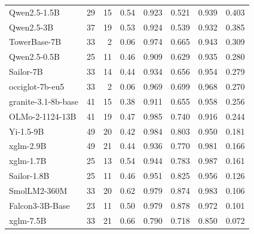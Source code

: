 \begin{center}
\begin{tabular}{lrrrrrrr}
Qwen2.5-1.5B & 29 & 15 & 0.54 & 0.923 & 0.521 & 0.939 & 0.403 \\
Qwen2.5-3B & 37 & 19 & 0.53 & 0.924 & 0.539 & 0.932 & 0.385 \\
TowerBase-7B & 33 & 2 & 0.06 & 0.974 & 0.665 & 0.943 & 0.309 \\
Qwen2.5-0.5B & 25 & 11 & 0.46 & 0.909 & 0.629 & 0.935 & 0.280 \\
Sailor-7B & 33 & 14 & 0.44 & 0.934 & 0.656 & 0.954 & 0.279 \\
occiglot-7b-eu5 & 33 & 2 & 0.06 & 0.969 & 0.699 & 0.968 & 0.270 \\
granite-3.1-8b-base & 41 & 15 & 0.38 & 0.911 & 0.655 & 0.958 & 0.256 \\
OLMo-2-1124-13B & 41 & 19 & 0.47 & 0.985 & 0.740 & 0.916 & 0.244 \\
Yi-1.5-9B & 49 & 20 & 0.42 & 0.984 & 0.803 & 0.950 & 0.181 \\
xglm-2.9B & 49 & 21 & 0.44 & 0.936 & 0.770 & 0.981 & 0.166 \\
xglm-1.7B & 25 & 13 & 0.54 & 0.944 & 0.783 & 0.987 & 0.161 \\
Sailor-1.8B & 25 & 11 & 0.46 & 0.951 & 0.825 & 0.956 & 0.126 \\
SmolLM2-360M & 33 & 20 & 0.62 & 0.979 & 0.874 & 0.983 & 0.106 \\
Falcon3-3B-Base & 23 & 11 & 0.50 & 0.979 & 0.878 & 0.972 & 0.101 \\
xglm-7.5B & 33 & 21 & 0.66 & 0.790 & 0.718 & 0.850 & 0.072 \\
\bottomrule
\end{tabular}
\end{center}
